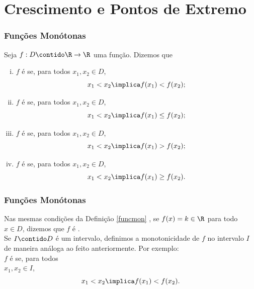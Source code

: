 \section{Crescimento e Pontos de Extremo}
\begin{frame}
\frametitle{Funções Monótonas} 

\begin{definicao}\label{funcmon}
Seja $f: D \contido \R \to \R$ uma função. Dizemos que
\begin{enumerate}[(i)]
	\item $f$ é  se, para todos $x_1, x_2 \in D$,
	$$x_1 < x_2 \implica f(x_1) < f(x_2);$$
	\item $f$ é  se, para todos $x_1, x_2 \in D$,
	$$x_1 < x_2 \implica f(x_1) \leq f(x_2);$$
	\item $f$ é  se, para todos $x_1, x_2 \in D$,
	$$x_1 < x_2 \implica f(x_1) > f(x_2);$$
	\item $f$ é  se, para todos $x_1, x_2 \in D$,
	$$x_1 < x_2 \implica f(x_1) \geq f(x_2).$$%
\end{enumerate}
\end{definicao}

\end{frame}



\begin{frame}
\frametitle{Funções Monótonas} 



Nas mesmas condições da Definição \ref{funcmon} , se $f(x) = k \in
\R$ para todo $x \in D$, dizemos que $f$ é .\\ \pause
Se $I \contido D$ é um intervalo, definimos a monotonicidade de $f$
no intervalo $I$ de maneira análoga ao feito anteriormente. Por
exemplo: \\
$f$ é  se, para todos\\
$x_1, x_2 \in I$,
	$$x_1 < x_2 \implica f(x_1) < f(x_2).$$


\end{frame}




